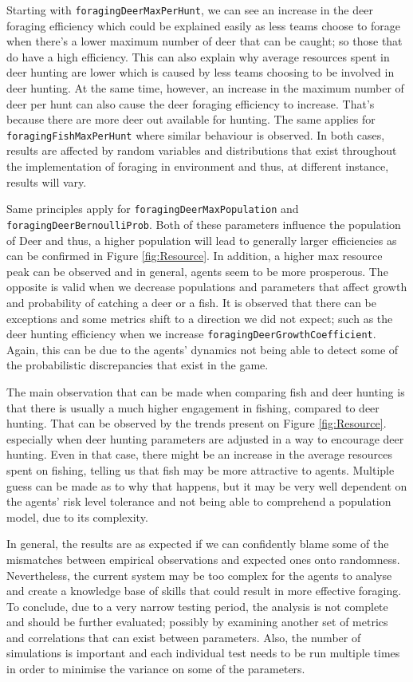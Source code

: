 Starting with \texttt{foragingDeerMaxPerHunt}, we can see an increase in the deer foraging efficiency which could be explained easily as less teams choose to forage when there’s a lower maximum number of deer that can be caught; so those that do have a high efficiency. This can also explain why average resources spent in deer hunting are lower which is caused by less teams choosing to be involved in deer hunting. At the same time, however, an increase in the maximum number of deer per hunt can also cause the deer foraging efficiency to increase. That’s because there are more deer out available for hunting. The same applies for \texttt{foragingFishMaxPerHunt} where similar behaviour is observed. In both cases, results are affected by random variables and distributions that exist throughout the implementation of foraging in environment and thus, at different instance, results will vary.


Same principles apply for \texttt{foragingDeerMaxPopulation} and \texttt{foragingDeerBernoulliProb}. Both of these parameters influence the population of Deer and thus, a higher population will lead to generally larger efficiencies as can be confirmed in Figure \ref{fig:Resource}. In addition, a higher max resource peak can be observed and in general, agents seem to be more prosperous. The opposite is valid when we decrease populations and parameters that affect growth and probability of catching a deer or a fish. It is observed that there can be exceptions and some metrics shift to a direction we did not expect; such as the deer hunting efficiency when we increase \texttt{foragingDeerGrowthCoefficient}. Again, this can be due to the agents’ dynamics not being able to detect some of the probabilistic discrepancies that exist in the game.

The main observation that can be made when comparing fish and deer hunting is that there is usually a much higher engagement in fishing, compared to deer hunting. That can be observed by the trends present on Figure \ref{fig:Resource}. especially when deer hunting parameters are adjusted in a way to encourage deer hunting. Even in that case, there might be an increase in the average resources spent on fishing, telling us that fish may be more attractive to agents. Multiple guess can be made as to why that happens, but it may be very well dependent on the agents’ risk level tolerance and not being able to comprehend a population model, due to its complexity.

In general, the results are as expected if we can confidently blame some of the mismatches between empirical observations and expected ones onto randomness. Nevertheless, the current system may be too complex for the agents to analyse and create a knowledge base of skills that could result in more effective foraging. To conclude, due to a very narrow testing period, the analysis is not complete and should be further evaluated; possibly by examining another set of metrics and correlations that can exist between parameters. Also, the number of simulations is important and each individual test needs to be run multiple times in order to minimise the variance on some of the parameters. 






